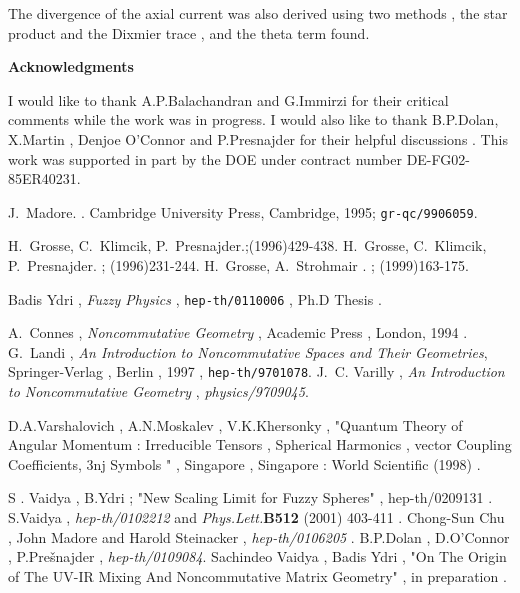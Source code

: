 \documentclass[a4paper,10pt]{article}
\begin{document}
The divergence of the axial current was also derived using two
methods , the star product and the Dixmier trace , and the theta
term found.

\begin{center}
{\bf\large Acknowledgments}
\end{center}
I would like to thank A.P.Balachandran and G.Immirzi for their
critical comments while the work was in progress. I would also
like to thank  B.P.Dolan, X.Martin , Denjoe O'Connor and
P.Presnajder  for their helpful discussions . This work was
supported in part by the DOE under contract number
DE-FG02-85ER40231.





\begin{thebibliography}{99}

J.~Madore.
.
\newblock Cambridge University Press, Cambridge, 1995;
{\tt gr-qc/9906059}.

H.~Grosse, C.~Klimcik, P.~Presnajder.;(1996)429-438. H.~Grosse, C.~Klimcik, P.~Presnajder.
; (1996)231-244.
H.~Grosse, A.~Strohmair .
; (1999)163-175.

Badis Ydri , {\it Fuzzy Physics} , {\tt hep-th/0110006} , Ph.D
Thesis .

A.~Connes , {\em Noncommutative Geometry} , Academic Press ,
London, 1994 . G.~Landi , {\em An Introduction to Noncommutative
Spaces and Their Geometries}, Springer-Verlag , Berlin , 1997 ,
{\tt hep-th/9701078}. J.~C. Varilly , {\it An Introduction to
Noncommutative Geometry} , {\em physics/9709045}.

D.A.Varshalovich , A.N.Moskalev , V.K.Khersonky , "Quantum Theory
of Angular Momentum : Irreducible Tensors , Spherical Harmonics ,
vector Coupling Coefficients, 3nj Symbols " , Singapore ,
Singapore : World Scientific (1998) .

S . Vaidya , B.Ydri ; "New Scaling Limit for Fuzzy Spheres" ,
hep-th/0209131 . S.Vaidya , {\it hep-th/0102212} and {\em
Phys.Lett.}{\bf B512} (2001) 403-411 . Chong-Sun Chu , John
Madore and Harold Steinacker , {\it hep-th/0106205} . B.P.Dolan ,
D.O'Connor , P.Pre\v{s}najder , {\it hep-th/0109084}. Sachindeo
Vaidya , Badis Ydri , "On The Origin of The UV-IR Mixing And
Noncommutative Matrix Geometry" , in preparation .


\end{thebibliography}
\end{document}
